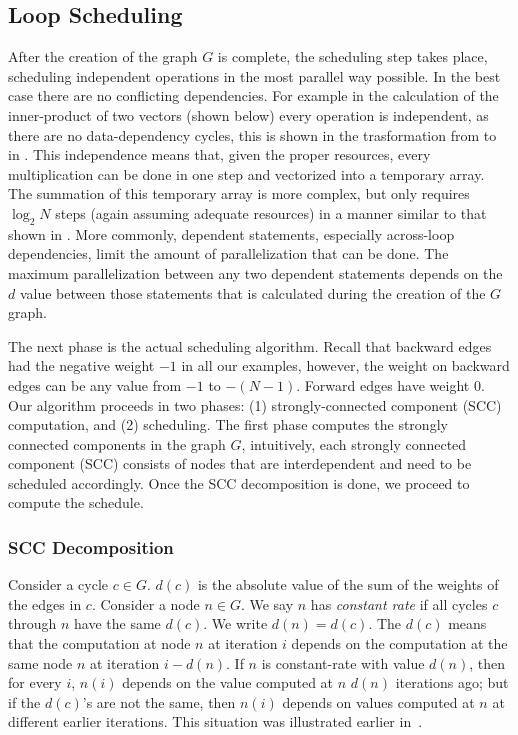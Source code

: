 \subsection{Loop Scheduling}
\label{sec:loopscheduling}

After the creation of the graph $G$ is complete, the scheduling step takes
place, scheduling independent operations in the most parallel way possible. In the 
best case there are no conflicting dependencies. For example in the calculation 
of the inner-product of two vectors (shown below) every operation is independent, 
as there are no data-dependency cycles, this is shown in the trasformation from
 to  in .
This independence means that, given the proper resources, every multiplication 
can be done in one step and vectorized into a temporary array. The summation of 
this temporary array is more complex, but only requires $\log_2N$ steps (again 
assuming adequate resources) in a manner similar to that shown
in . 
More commonly, dependent statements, especially across-loop dependencies, 
limit the amount of parallelization that can be done. The maximum parallelization 
between any two dependent statements depends on the $d$ value between those statements
that is calculated during the creation of the $G$ graph. 

The next phase is the actual scheduling algorithm. Recall that backward edges had
the negative weight $-1$ in all our examples, however, the weight on backward edges can be any value from $-1$ 
to $-(N-1)$. Forward edges have weight 0. Our algorithm proceeds in two phases: (1) strongly-connected component (SCC)
computation, and (2) scheduling. The first phase computes the strongly connected components in the graph $G$, intuitively,
each strongly connected component (SCC) consists of nodes that are interdependent and need to be scheduled accordingly. 
Once the SCC decomposition is done, we proceed to compute the schedule.



\subsubsection{SCC Decomposition}
\label{sec:SCC}

Consider a cycle $c \in G$. $d(c)$ is the absolute value of the sum of the weights of the edges in $c$. Consider a 
node $n \in G$. We say $n$ has \emph{constant rate} if all cycles $c$ through $n$ have the same $d(c)$. We write 
$d(n) = d(c)$. The $d(c)$ means that the computation at node $n$ at iteration $i$ depends on the computation 
at the same node $n$ at iteration $i-d(n)$. If $n$ is constant-rate with value $d(n)$, then for every $i$, $n(i)$
depends on the value computed at $n$ $d(n)$ iterations ago; but if the $d(c)$'s are not the same, then $n(i)$ depends on 
values computed at $n$ at different earlier iterations. This situation was illustrated earlier in~. 

